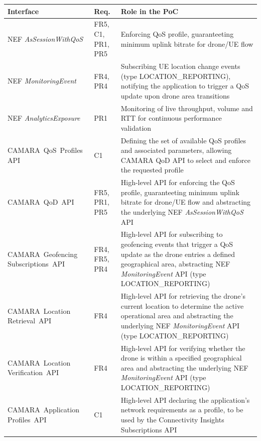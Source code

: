 \begin{table}[ht]
\centering
\small
\renewcommand{\arraystretch}{1.3}
\begin{tabular}{p{3.9cm} p{1.4cm} p{8.1cm}}
\toprule
\textbf{Interface} & \textbf{Req.} & \textbf{Role in the \acs{PoC}} \\
\midrule
\parbox[t]{3.9cm}{\acs{NEF} \textit{AsSessionWithQoS}} & FR5, C1, PR1, PR5 & Enforcing \acs{QoS} profile, guaranteeting minimum uplink bitrate for drone/\acs{UE} flow \\
\parbox[t]{3.9cm}{\acs{NEF} \textit{MonitoringEvent}} & FR4, PR4 & Subscribing \acs{UE} location change events (type LOCATION\_REPORTING), notifying the application to trigger a \acs{QoS} update upon drone area transitions \\
\parbox[t]{3.9cm}{\acs{NEF} \textit{AnalyticsExposure}} & PR1 & Monitoring of live throughput, volume and \acs{RTT} for continuous performance validation \\
\mbox{CAMARA \acs{QoS} Profiles} \acs{API} & C1 & Defining the set of available \acs{QoS} profiles and associated parameters, allowing CAMARA \acs{QoD} \acs{API} to select and enforce the requested profile \\
\mbox{CAMARA \acs{QoD} \acs{API}} & FR5, PR1, PR5 & High-level \acs{API} for enforcing the \acs{QoS} profile, guaranteeting minimum uplink bitrate for drone/\acs{UE} flow and abstracting the underlying \acs{NEF} \textit{AsSessionWithQoS} \acs{API} \\
\mbox{CAMARA Geofencing} \mbox{Subscriptions \acs{API}} & FR4, FR5, PR4 & High-level \acs{API} for subscribing to geofencing events that trigger a \acs{QoS} update as the drone entries a defined geographical area, abstracting \acs{NEF} \textit{MonitoringEvent} \acs{API} (type LOCATION\_REPORTING) \\
\mbox{CAMARA Location} \mbox{Retrieval \acs{API}} & FR4 & High-level \acs{API} for retrieving the drone's current location to determine the active operational area and abstracting the underlying \acs{NEF} \textit{MonitoringEvent} \acs{API} (type LOCATION\_REPORTING)  \\
\mbox{CAMARA Location} \mbox{Verification \acs{API}} & FR4 & High-level \acs{API} for verifying whether the drone is within a specified geographical area and abstracting the underlying \acs{NEF} \textit{MonitoringEvent} \acs{API} (type LOCATION\_REPORTING)  \\
\mbox{CAMARA Application} \mbox{Profiles \acs{API}} & C1 & High-level \acs{API} declaring the application's network requirements as a profile, to be used by the Connectivity Insights Subscriptions \acs{API} \\

\end{tabular}
\end{table}
